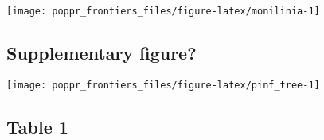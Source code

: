 \documentclass{frontiersSCNS} %
\newenvironment{CodeChunk}{}{}
\begin{document}
\begin{CodeChunk}

\texttt{[image: poppr\_frontiers\_files/figure-latex/monilinia-1]} \end{CodeChunk}

\subsection*{Supplementary figure?}\label{supplementary-figure}

\begin{CodeChunk}

\texttt{[image: poppr\_frontiers\_files/figure-latex/pinf\_tree-1]} \end{CodeChunk}

\subsection*{Table 1}\label{table-1}
\end{document}
